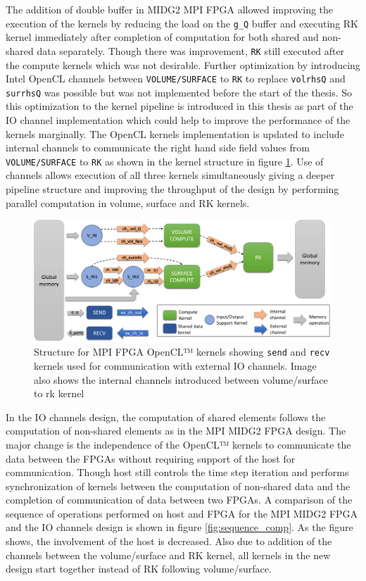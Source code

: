 The addition of double buffer in MIDG2 MPI FPGA allowed improving the execution of the kernels
by reducing the load on the \texttt{g\_Q} buffer and executing RK kernel immediately after completion
of computation for both shared and non-shared data separately. Though there was improvement,
\texttt{RK} still executed after the compute kernels which was not desirable. Further optimization
by introducing Intel OpenCL channels between \texttt{VOLUME/SURFACE} to \texttt{RK} to replace
\texttt{volrhsQ} and \texttt{surrhsQ} was possible but was not implemented before the start of the thesis.
So this optimization to the kernel pipeline is introduced in this thesis as part of the IO channel implementation
which could help to improve the performance of the kernels marginally.
The OpenCL kernels implementation is updated to include internal channels to
communicate the right hand side field values
from \texttt{VOLUME/SURFACE} to \texttt{RK} as shown in the kernel structure
in figure \ref{fig:iochan_kernstruc}. Use of channels allows execution of all three
kernels simultaneously giving a deeper pipeline structure and improving the throughput
of the design by performing parallel computation in volume, surface and RK kernels.

\begin{figure}[ht]%
    \centering
    \includegraphics[width=1.0\textwidth]{images/iochan_kernstruc}
    \caption{Structure for MPI FPGA OpenCL™ kernels showing \texttt{send} and \texttt{recv}
    kernels used for communication with external IO channels. Image also shows the internal
    channels introduced between volume/surface to rk kernel}
    \label{fig:iochan_kernstruc}
\end{figure}

In the IO channels design, the computation of shared elements follows the computation of
non-shared elements as in the MPI MIDG2 FPGA design. The major change is the independence of the OpenCL™ kernels to
communicate the data between the FPGAs without requiring support of the host for
communication. Though host still controls the time step iteration and performs synchronization of kernels between
the computation of non-shared data and the completion of communication of data between two FPGAs.
A comparison of the sequence of operations performed on host and FPGA for the MPI MIDG2 FPGA and
the IO channels design is shown in figure \ref{fig:sequence_comp}. As the figure shows,
the involvement of the host is decreased. Also due to addition of the channels between
the volume/surface and RK kernel, all kernels in the new design start together instead
of RK following volume/surface.

